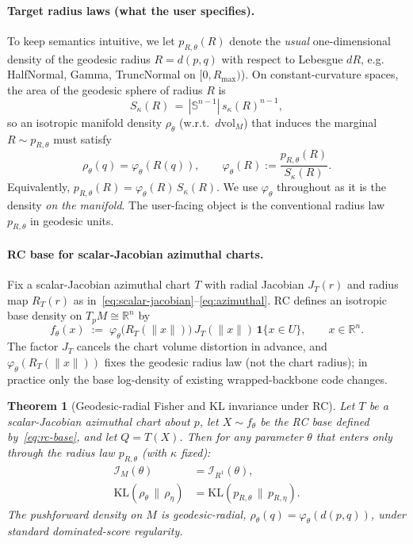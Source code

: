 \documentclass{article}
\newtheorem{theorem}{Theorem}
\theoremstyle{definition}
\theoremstyle{remark}
\newcommand{\RR}{\mathbb{R}}
\newcommand{\SSS}{\mathbb{S}}
\begin{document}
\paragraph{Target radius laws (what the user specifies).}
To keep semantics intuitive, we let $p_{R,\theta}(R)$ denote the \emph{usual} one-dimensional density
of the geodesic radius $R=d(p,q)$ with respect to Lebesgue $dR$, e.g. HalfNormal, Gamma,
TruncNormal on $[0,R_{\max})$). On constant-curvature spaces, the area of the geodesic sphere of
radius $R$ is
\[
S_\kappa(R)\,=\,|\SSS^{n-1}|\,s_\kappa(R)^{n-1},
\]
so an isotropic manifold density $\rho_\theta$ (w.r.t.\ $d\mathrm{vol}_M$) that induces the marginal
$R\sim p_{R,\theta}$ must satisfy
\begin{equation}
\rho_\theta(q)=\varphi_\theta(R(q)),
\qquad
\varphi_\theta(R):=\frac{p_{R,\theta}(R)}{S_\kappa(R)}.
\label{eq:varphi_from_pR}
\end{equation}
Equivalently, $p_{R,\theta}(R)=\varphi_\theta(R)\,S_\kappa(R)$.
We use $\varphi_\theta$ throughout as it is the density \emph{on the manifold}. The user-facing
object is the conventional radius law $p_{R,\theta}$ in geodesic units.


\paragraph{RC base for scalar-Jacobian azimuthal charts.}
Fix a scalar-Jacobian azimuthal chart $T$ with radial Jacobian $J_T(r)$ and radius map
$R_T(r)$ as in~\eqref{eq:scalar-jacobian}--\eqref{eq:azimuthal}. RC defines an isotropic
base density on $T_pM\cong\RR^n$ by
\begin{equation}
  f_\theta(x)
  \;:=\;
  \varphi_\theta\!\bigl(R_T(\|x\|)\bigr)\,J_T(\|x\|)\,\mathbf{1}\{x\in U\},
  \qquad x\in\RR^n.
  \label{eq:rc-base}
\end{equation}
The factor $J_T$ cancels the chart volume distortion in advance, and $\varphi_\theta(R_T(\|x\|))$ fixes the geodesic radius law (not the chart radius); in practice only the base log-density of existing wrapped-backbone code changes.


\begin{theorem}[Geodesic-radial Fisher and KL invariance under RC]
\label{thm:rc-invariances}
Let $T$ be a scalar-Jacobian azimuthal chart about $p$, let $X\sim f_\theta$
be the RC base defined by~\eqref{eq:rc-base}, and let $Q=T(X)$.
Then for any parameter $\theta$ that enters only through the radius law
$p_{R,\theta}$ (with $\kappa$ fixed):
\begin{align}
\mathcal{I}_M(\theta) &= \mathcal{I}_{R^1}(\theta), \label{eq:fisher-eq}\\
\mathrm{KL}(\rho_\theta\,\|\,\rho_\eta) &= \mathrm{KL}(p_{R,\theta}\,\|\,p_{R,\eta}).
\label{eq:kl-eq}
\end{align}
The pushforward density on $M$ is geodesic-radial,
$\rho_\theta(q)=\varphi_\theta(d(p,q))$,
under standard dominated-score regularity.
\end{theorem}
\end{document}
